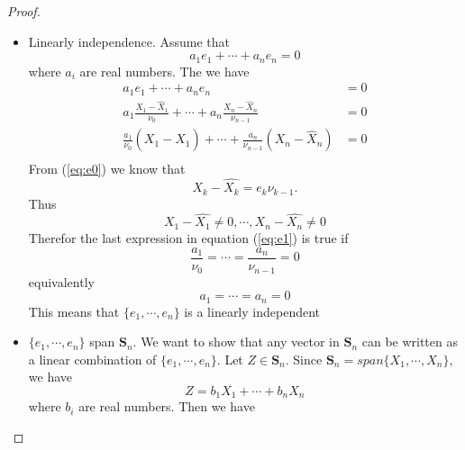 \documentclass[11pt, oneside]{article}   	%
\begin{document}
\begin{proof}
\begin{itemize}
\item Linearly independence.
Assume that 
\begin{equation}
  a_{1}e_{1}+\cdots+a_{n}e_{n} = 0
  \end{equation}
  where $a_{i}$ are real numbers. The we have 
\begin{equation}\label{eq:e1}
\begin{split}
a_{1}e_{1}+\cdots+a_{n}e_{n} &= 0\\
a_{1}\frac{X_{1}-\hat{X}_{1}}{\nu_{0}}+\cdots+a_{n}\frac{X_{n}-\hat{X}_{n}}{\nu_{n-1}} &= 0\\
\frac{a_{1}}{\nu_{0}}(X_{1}-\hat{X}_{1}) + \cdots+ \frac{a_{n}}{\nu_{n-1}}(X_{n}-\hat{X}_{n}) &=0\\
\end{split}
\end{equation}
From (\ref{eq:e0}) we know that 
\begin{equation}
X_{k}-\hat{X_{k}} = e_{k}\nu_{k-1}.
\end{equation}
Thus 
\begin{equation}
X_{1} -\hat{X_{1}} \neq 0 , \cdots, X_{n}-\hat{X_{n}} \neq 0 
\end{equation} 
Therefor the last expression in equation (\ref{eq:e1}) is true if 
\begin{equation}
\frac{a_{1}}{\nu_{0}} = \cdots =\frac{a_{n}}{\nu_{n-1}} = 0
\end{equation} 
equivalently 
\begin{equation}
a_{1} = \cdots =a_{n} = 0
\end{equation}
This means that $\{e_{1},\cdots,e_{n}\}$ is a linearly independent
 
\item $\{e_{1},\cdots,e_{n}\}$ span $\textbf{S}_{n}$. We want to show that any vector in $\textbf{S}_{n}$ can be written as a linear combination of $\{e_{1},\cdots,e_{n}\}$.
Let $Z \in \textbf{S}_{n}$. Since $\textbf{S}_{n} = span\{ X_{1},\cdots, X_{n}  \}$, we have 
\begin{equation}
Z = b_{1}X_{1} + \cdots + b_{n}X_{n}
\end{equation}
where $b_{i}$ are real numbers. Then we have 


\end{itemize}
\end{proof}
\end{document}
